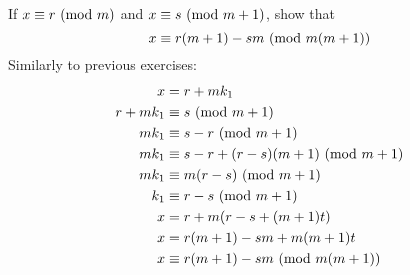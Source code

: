 \documentclass{article}
\begin{document}
\subsection{}
If $x \equiv r \ (\mathrm{mod}\ m)$ and $x \equiv s \ (\mathrm{mod}\ m + 1)$, show that
\begin{equation*}
    x \equiv r(m + 1) - sm \ (\mathrm{mod}\ m(m + 1))
\end{equation*}
Similarly to previous exercises:
\begin{align*}
    x &= r + mk_1\\
    r + mk_1 &\equiv s \ (\mathrm{mod}\ m + 1)\\
    mk_1 &\equiv s - r \ (\mathrm{mod}\ m + 1)\\
    mk_1 &\equiv s - r + (r - s)(m + 1) \ (\mathrm{mod}\ m + 1)\\
    mk_1 &\equiv m(r - s) \ (\mathrm{mod}\ m + 1)\\
    k_1 &\equiv r - s \ (\mathrm{mod}\ m + 1)\\
    x &= r + m(r - s + (m + 1)t)\\
    x &= r(m + 1) - sm + m(m + 1)t\\
    x &\equiv r(m + 1) - sm \ (\mathrm{mod}\ m(m + 1))\\
\end{align*}

\end{document}

